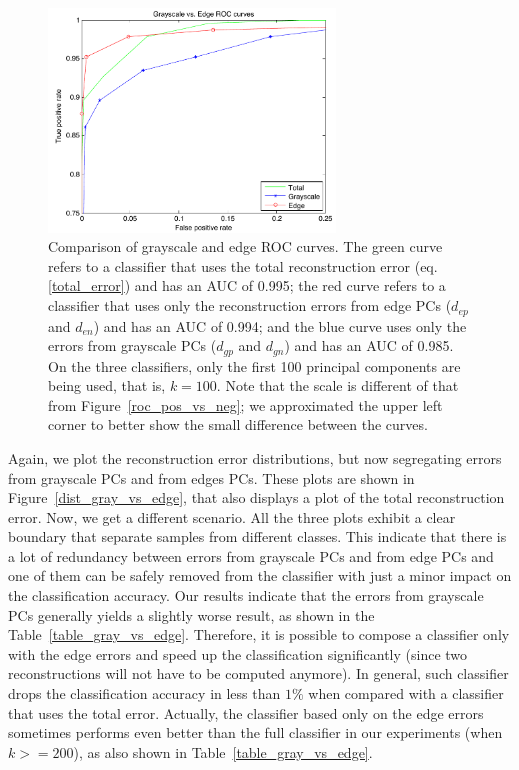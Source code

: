 \documentclass[10pt, conference, compsocconf]{IEEEtran}
\begin{document}
\begin{figure}[t!]
\centering
\includegraphics[width=3in]{roc_gray_vs_edge}
\caption{Comparison of grayscale and edge ROC curves. The green curve refers to a classifier that uses the total reconstruction error (eq. \ref{total_error}) and has an AUC of 0.995; the red curve refers to a classifier that uses only the reconstruction errors from edge PCs ($d_{ep}$ and $d_{en}$) and has an AUC of 0.994; and the blue curve uses only the errors from grayscale PCs ($d_{gp}$ and $d_{gn}$) and has an AUC of 0.985. On the three classifiers, only the first 100 principal components are being used, that is, $k=100$. Note that the scale is different of that from Figure~\ref{roc_pos_vs_neg}; we approximated the upper left corner to better show the small difference between the curves.}
\label{roc_gray_vs_edge}
\end{figure}

Again, we plot the reconstruction error distributions, but now segregating errors from grayscale PCs and from edges PCs. These plots are shown in Figure~\ref{dist_gray_vs_edge}, that also displays a plot of the total reconstruction error. Now, we get a different scenario. All the three plots exhibit a clear boundary that separate samples from different classes. This indicate that there is a lot of redundancy between errors from grayscale PCs and from edge PCs and one of them can be safely removed from the classifier with just a minor impact on the classification accuracy. Our results indicate that the errors from grayscale PCs generally yields a slightly worse result, as shown in the Table~\ref{table_gray_vs_edge}. Therefore, it is possible to compose a classifier only with the edge errors and speed up the classification significantly (since two reconstructions will not have to be computed anymore). In general, such classifier drops the classification accuracy in less than $1\%$ when compared with a classifier that uses the total error. Actually, the classifier based only on the edge errors sometimes performs even better than the full classifier in our experiments (when $k >= 200$), as also shown in Table~\ref{table_gray_vs_edge}.
\end{document}

